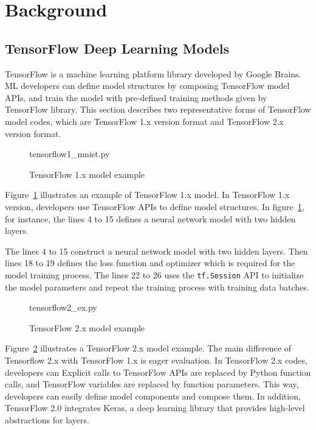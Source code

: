 \section{Background}\label{sec:background}
\subsection{TensorFlow Deep Learning Models}



TensorFlow\cite{tensorflow} is a machine learning platform library
developed by Google Brains.
ML developers can define model structures by composing
TensorFlow model APIs, and train the model with pre-defined training
methods given by TensorFlow library.
This section describes two representative forms of TensorFlow
model codes, which are TensorFlow 1.x version format and 
TensorFlow 2.x version format.

\begin{figure}[ht!]

{tensorflow1_mnist.py}
  \caption{TensorFlow 1.x model example}
\label{fig:back:tf1}
\end{figure}

Figure~\ref{fig:back:tf1} illustrates an example of TensorFlow 1.x model.
In TensorFlow 1.x version, developers use TensorFlow APIs to define model
structures.
In figure~\ref{fig:back:tf1}, for instance, the lines 4 to 15
defines a neural network model with two hidden layers.


The lines 4 to 15 construct a neural network model with two hidden layers. 
Then lines 18 to 19 defines the loss function and optimizer which is required
for the model training process.
The lines 22 to 26 uses the {\tt tf.Session} API to initialize the
model parameters and repeat the training process with training data batches.
 
\begin{figure}[ht!]

{tensorflow2_ex.py}
  \caption{TensorFlow 2.x model example}
\label{fig:back:tf2}
\end{figure}

Figure~\ref{fig:back:tf2} illustrates a TensorFlow 2.x model example.
The main difference of Tensorflow 2.x with TensorFlow 1.x is eager evaluation.
In TensorFlow 2.x codes, developers can 
Explicit calls to TensorFlow APIs are replaced by Python function calls,
and TensorFlow variables are replaced by function parameters.
This way, developers can easily define model components and compose them. 
In addition, TensorFlow 2.0 integrates Keras\cite{keras},
a deep learning library that provides high-level abstractions for layers.

